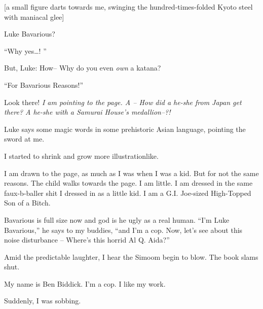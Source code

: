 [a small figure darts towards me, swinging the hundred-times-folded
Kyoto steel with maniacal glee]



Luke Bavarious?



``Why yes{\ldots}! ''



But, Luke: How-- Why do you even {\em own} a katana?



``For Bavarious Reasons!''



Look there! {\em I am pointing to the page. A -- How did a he-she
from Japan get there? A he-she with a Samurai House's
medallion--?!}



Luke says some magic words in some prehistoric Asian language,
pointing the sword at me.



I started to shrink and grow more illustrationlike.



I am drawn to the page, as much as I was when I was a kid. But for
not the same reasons. The child walks towards the page. I am
little. I am dressed in the same faux-b-baller shit I dressed in as
a little kid. I am a G.I. Joe-sized High-Topped Son of a
Bitch.



Bavarious is full size now and god is he ugly as a real human. ``I'm
Luke Bavarious,'' he says to my buddies, ``and I'm a cop. Now, let's
see about this noise disturbance -- Where's this horrid Al Q.
Aida?''



Amid the predictable laughter, I hear the Simoom begin to blow. The
book slams shut.



My name is Ben Biddick. I'm a cop. I like my work.





Suddenly, I was sobbing. 
 



